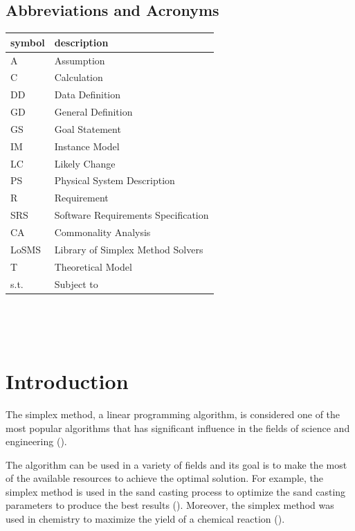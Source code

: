 \documentclass[12pt]{article}
\newcommand{\famname}{LoSMS} %
\begin{document}
\subsection{Abbreviations and Acronyms}

\renewcommand{\arraystretch}{1.2}
\begin{tabular}{l l} 
  \toprule		
  \textbf{symbol} & \textbf{description}\\
  \midrule 
  A & Assumption\\
  C & Calculation \\
  DD & Data Definition\\
  GD & General Definition\\
  GS & Goal Statement\\
  IM & Instance Model\\
  LC & Likely Change\\
  PS & Physical System Description\\
  R & Requirement\\
  SRS & Software Requirements Specification\\
  CA & Commonality Analysis\\
  \famname{} & Library of Simplex Method Solvers\\
  T & Theoretical Model\\
  s.t. & Subject to\\
  \bottomrule
\end{tabular}\\

\newpage

\tableofcontents

~\newpage


\section{Introduction}

The simplex method, a linear programming algorithm, is considered one of the 
most popular algorithms that has significant influence in the fields of science 
and engineering (\cite{simplex-popularity}). 

The algorithm can be used in a variety of fields and its goal is to make the 
most of the available resources to achieve the optimal solution. For example, 
the simplex method is used in the sand casting process to optimize the sand 
casting parameters to produce the best results (\cite{sand-casting}). Moreover, 
the simplex method was used in chemistry to maximize the yield of a chemical 
reaction (\cite{chemistry}).
\end{document}

